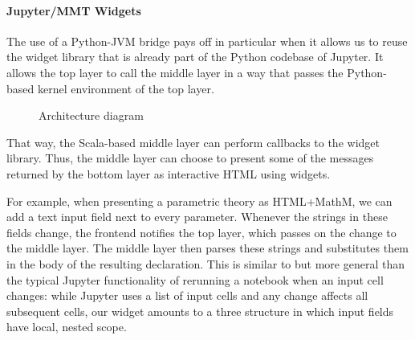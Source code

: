 \paragraph{Jupyter/MMT Widgets}
The use of a Python-JVM bridge pays off in particular when it allows us to reuse the widget library that is already part of the Python codebase of Jupyter.
It allows the top layer to call the middle layer in a way that passes the Python-based kernel environment of the top layer.

\begin{figure}[ht]\centering
  \caption{Architecture diagram}\label{fig:architecture-diagram}
\end{figure}

That way, the Scala-based middle layer can perform callbacks to the widget library.
Thus, the middle layer can choose to present some of the messages returned by the bottom layer as interactive HTML using widgets.

For example, when presenting a parametric theory as HTML+MathM, we can add a text input field next to every parameter.
Whenever the strings in these fields change, the frontend notifies the top layer, which passes on the change to the middle layer.
The middle layer then parses these strings and substitutes them in the body of the resulting declaration.
This is similar to but more general than the typical Jupyter functionality of rerunning a notebook when an input cell changes: while Jupyter uses a list of input cells and any change affects all subsequent cells, our widget amounts to a three structure in which input fields have local, nested scope.




